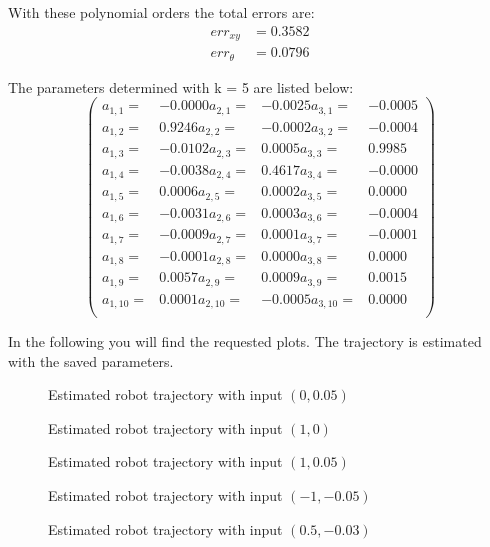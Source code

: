 \documentclass[conference]{IEEEtran}
\begin{document}
\begin{compactenum}[a)]
With these polynomial orders the total errors are:
\begin{align}
	err_{xy} & = 0.3582\\
	err_{\theta} & = 0.0796
\end{align}

The parameters determined with k = 5 are listed below:
\vspace{20pt}
$$
\left(
\scriptscriptstyle{
\begin{smallmatrix}
a_{1,1} =&	 -0.0000	a_{2,1} =&  -0.0025   a_{3,1} =&	-0.0005 \\
a_{1,2} =&    0.9246    a_{2,2} =&	-0.0002   a_{3,2} =&	-0.0004 \\
a_{1,3} =&   -0.0102    a_{2,3} =&	 0.0005	  a_{3,3} =&	 0.9985 \\
a_{1,4} =&   -0.0038    a_{2,4} =&	 0.4617   a_{3,4} =&	-0.0000 \\
a_{1,5} =&    0.0006    a_{2,5} =&	 0.0002   a_{3,5} =&	 0.0000 \\
a_{1,6} =&   -0.0031    a_{2,6} =&	 0.0003   a_{3,6} =&	-0.0004 \\
a_{1,7} =&   -0.0009    a_{2,7} =&	 0.0001   a_{3,7} =&	-0.0001 \\
a_{1,8} =&   -0.0001    a_{2,8} =&	 0.0000   a_{3,8} =&	 0.0000 \\
a_{1,9} =&    0.0057    a_{2,9} =&	 0.0009   a_{3,9} =&	 0.0015 \\
a_{1,10} =&    0.0001   a_{2,10} =&	-0.0005   a_{3,10} =&	 0.0000 \\
\end{smallmatrix}}
\right)
$$

\item In the following you will find the requested plots. The trajectory is estimated with the saved parameters.
\begin{figure}[h!]
  	\centering
    \scalebox{.6}{}
    \caption{Estimated robot trajectory with input $(0,0.05)$}
    \label{fig:robotLR1}
\end{figure}
\begin{figure}[h!]
  	\centering
    \scalebox{.6}{}
    \caption{Estimated robot trajectory with input $(1,0)$}
    \label{fig:robotLR2}
\end{figure}
\begin{figure}[h!]
  	\centering
    \scalebox{.6}{}
    \caption{Estimated robot trajectory with input $(1,0.05)$}
    \label{fig:robotLR3}
\end{figure}
\begin{figure}[h!]
  	\centering
    \scalebox{.6}{}
    \caption{Estimated robot trajectory with input $(-1,-0.05)$}
    \label{fig:robotLR4}
\end{figure}
\begin{figure}[h!]
  	\centering
    \scalebox{.6}{}
    \caption{Estimated robot trajectory with input $(0.5,-0.03)$}
    \label{fig:robotLR5}
\end{figure}
\end{compactenum}
\end{document}
